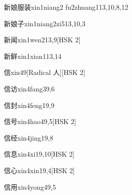 \begin{entry}{新娘服装}{xin1niang2 fu2zhuang1}{13,10,8,12}
\end{entry}

\begin{entry}{新娘子}{xin1niang2zi5}{13,10,3}
\end{entry}

\begin{entry}{新闻}{xin1wen2}{13,9}[HSK 2]
\end{entry}

\begin{entry}{新鲜}{xin1xian1}{13,14}
\end{entry}

\begin{entry}{信}{xin4}{9}[Radical 人][HSK 2]
\end{entry}

\begin{entry}{信访}{xin4fang3}{9,6}
\end{entry}

\begin{entry}{信封}{xin4feng1}{9,9}
\end{entry}

\begin{entry}{信号}{xin4hao4}{9,5}[HSK 2]
\end{entry}

\begin{entry}{信经}{xin4jing1}{9,8}
\end{entry}

\begin{entry}{信息}{xin4xi1}{9,10}[HSK 2]
\end{entry}

\begin{entry}{信心}{xin4xin1}{9,4}[HSK 2]
\end{entry}

\begin{entry}{信用}{xin4yong4}{9,5}
\end{entry}

